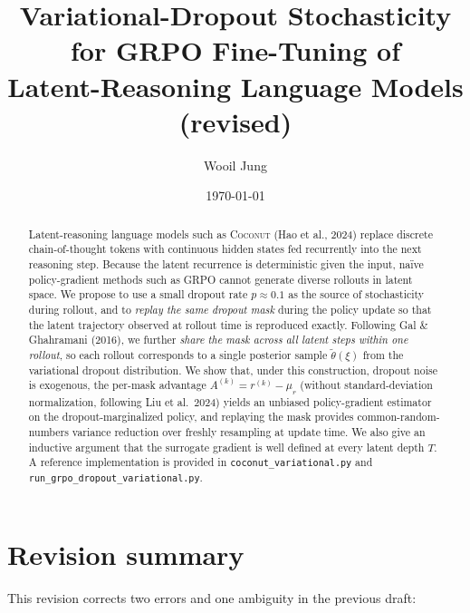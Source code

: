 \documentclass[11pt]{article}
\title{Variational-Dropout Stochasticity for GRPO Fine-Tuning of \\
       Latent-Reasoning Language Models \\[4pt]
       \large (revised)}
\author{Wooil Jung}
\date{\today}
\theoremstyle{definition}
\theoremstyle{remark}
\begin{document}
\maketitle

\begin{abstract}
Latent-reasoning language models such as \textsc{Coconut} (Hao et al., 2024)
replace discrete chain-of-thought tokens with continuous hidden states fed
recurrently into the next reasoning step.  Because the latent recurrence is
deterministic given the input, na\"ive policy-gradient methods such as GRPO
cannot generate diverse rollouts in latent space.  We propose to use a small
dropout rate $p \approx 0.1$ as the source of stochasticity during rollout, and
to \emph{replay the same dropout mask} during the policy update so that the
latent trajectory observed at rollout time is reproduced exactly.  Following
Gal \& Ghahramani (2016), we further \emph{share the mask across all latent
steps within one rollout}, so each rollout corresponds to a single posterior
sample $\tilde\theta(\xi)$ from the variational dropout distribution.  We show
that, under this construction, dropout noise is exogenous, the per-mask
advantage $A^{(k)} = r^{(k)} - \mu_r$ (without standard-deviation
normalization, following Liu et al.\ 2024) yields an unbiased policy-gradient
estimator on the dropout-marginalized policy, and replaying the mask provides
common-random-numbers variance reduction over freshly resampling at update
time.  We also give an inductive argument that the surrogate gradient is
well defined at every latent depth $T$.  A reference implementation is
provided in \texttt{coconut\_variational.py} and
\texttt{run\_grpo\_dropout\_variational.py}.
\end{abstract}

\section{Revision summary}

This revision corrects two errors and one ambiguity in the previous draft:
\end{document}
